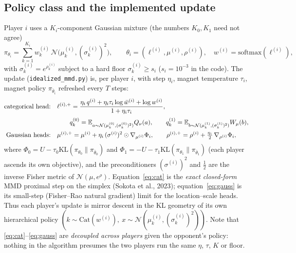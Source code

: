 \documentclass[11pt]{article}
\theoremstyle{definition}
\newcommand{\E}{\mathbb{E}}
\newcommand{\KL}{\mathrm{KL}}
\begin{document}
\subsection{Policy class and the implemented update}
Player $i$ uses a $K_i$-component Gaussian mixture (the numbers $K_0, K_1$ need
not agree)
\begin{equation}
  \pi_{\theta_i} = \sum_{k=1}^{K_i} w^{(i)}_k\,
  \mathcal{N}\big(\mu^{(i)}_k, (\sigma^{(i)}_k)^2\big), \qquad
  \theta_i = (\ell^{(i)}, \mu^{(i)}, \rho^{(i)}), \quad
  w^{(i)} = \mathrm{softmax}(\ell^{(i)}),
\end{equation}
with $\sigma^{(i)}_k = e^{\rho^{(i)}_k}$ subject to a hard floor
$\sigma^{(i)}_k \ge s_i$ ($s_i = 10^{-3}$ in the code). The update
(\texttt{idealized\_mmd.py}) is, per player $i$, with step $\eta_i$, magnet
temperature $\tau_i$, magnet policy $\pi_{\bar\theta_i}$ refreshed every $T$
steps:
\begin{align}
  \text{categorical head:}\quad
  & \ell^{(i),+} = \frac{\eta_i\, q^{(i)} + \eta_i \tau_i \log \bar w^{(i)}
    + \log w^{(i)}}{1 + \eta_i\tau_i},
  \label{eq:cat}\\[2pt]
  & \qquad q^{(0)}_k = \E_{a \sim \mathcal{N}(\mu^{(0)}_k, (\sigma^{(0)}_k)^2)}
    Q_\nu(a), \qquad
    q^{(1)}_k = \E_{b \sim \mathcal{N}(\mu^{(1)}_k, (\sigma^{(1)}_k)^2)}
    W_\mu(b), \notag\\
  \text{Gaussian heads:}\quad
  & \mu^{(i),+} = \mu^{(i)} + \eta_i\, (\sigma^{(i)})^2 \odot
    \nabla_{\mu^{(i)}} \Phi_i, \qquad
    \rho^{(i),+} = \rho^{(i)} + \tfrac{\eta_i}{2}\,
    \nabla_{\rho^{(i)}} \Phi_i,
  \label{eq:gauss}
\end{align}
where $\Phi_0 = U - \tau_0 \KL(\pi_{\theta_0} \| \pi_{\bar\theta_0})$ and
$\Phi_1 = -U - \tau_1 \KL(\pi_{\theta_1} \| \pi_{\bar\theta_1})$ (each player
ascends its own objective), and the preconditioners $(\sigma^{(i)})^2$ and
$\tfrac12$ are the inverse Fisher metric of $\mathcal{N}(\mu, e^{\rho})$.
Equation~\eqref{eq:cat} is the \emph{exact closed-form} MMD proximal step on
the simplex (Sokota et al., 2023); equation~\eqref{eq:gauss} is its small-step
(Fisher--Rao natural gradient) limit for the location--scale heads. Thus each
player's update is mirror descent in the KL geometry of its own hierarchical
policy $(k \sim \mathrm{Cat}(w^{(i)}),\ x \sim \mathcal{N}(\mu^{(i)}_k,
(\sigma^{(i)}_k)^2))$. Note that \eqref{eq:cat}--\eqref{eq:gauss} are
\emph{decoupled across players} given the opponent's policy: nothing in the
algorithm presumes the two players run the same $\eta$, $\tau$, $K$ or floor.
\end{document}
